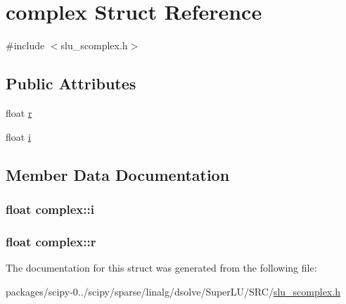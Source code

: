 \hypertarget{structcomplex}{}\section{complex Struct Reference}
\label{structcomplex}


{\ttfamily \#include $<$slu\+\_\+scomplex.\+h$>$}

\subsection*{Public Attributes}
\begin{DoxyCompactItemize}
\item 
float \hyperlink{structcomplex_a6b24d5cc84eef41dbe90b79e93de030f}{r}
\item 
float \hyperlink{structcomplex_a5eefa12b02189d694af536bc7d8726be}{i}
\end{DoxyCompactItemize}


\subsection{Member Data Documentation}
\hypertarget{structcomplex_a5eefa12b02189d694af536bc7d8726be}{}
\subsubsection[{i}]{\setlength{\rightskip}{0pt plus 5cm}float complex\+::i}\label{structcomplex_a5eefa12b02189d694af536bc7d8726be}
\hypertarget{structcomplex_a6b24d5cc84eef41dbe90b79e93de030f}{}
\subsubsection[{r}]{\setlength{\rightskip}{0pt plus 5cm}float complex\+::r}\label{structcomplex_a6b24d5cc84eef41dbe90b79e93de030f}


The documentation for this struct was generated from the following file\+:\begin{DoxyCompactItemize}
\item 
packages/scipy-\/0../scipy/sparse/linalg/dsolve/\+Super\+L\+U/\+S\+R\+C/\hyperlink{slu__scomplex_8h}{slu\+\_\+scomplex.\+h}\end{DoxyCompactItemize}
